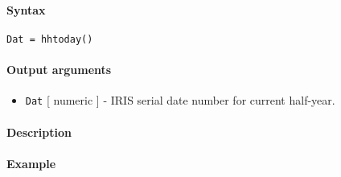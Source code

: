 


	\paragraph{Syntax}

\begin{verbatim}
Dat = hhtoday()
\end{verbatim}

\paragraph{Output arguments}

\begin{itemize}
\itemsep1pt\parskip0pt
\item
  \texttt{Dat} {[} numeric {]} - IRIS serial date number for current
  half-year.
\end{itemize}

\paragraph{Description}

\paragraph{Example}


